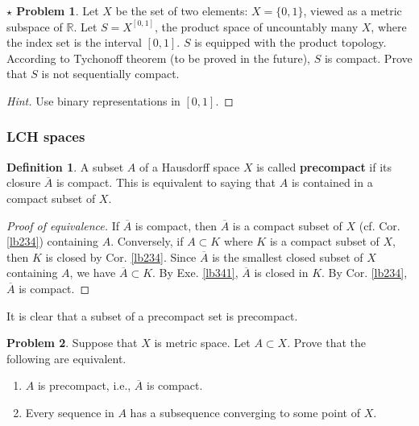 \documentclass[12pt,b5paper,notitlepage]{article}
\theoremstyle{definition}
\newtheorem{df}{Definition}[section]
\newtheorem{prob}{\color{red}Problem}[section]
\newtheorem{sprob}[prob]{\color{red}$\star$ Problem}
\theoremstyle{plain}
\newcommand{\ovl}{\overline}
\newcommand{\Rbb}{\mathbb R}
\numberwithin{equation}{section}
\begin{document}
\begin{sprob}
Let $X$ be the set of two elements: $X=\{0,1\}$, viewed as a metric subspace of $\Rbb$. Let $S=X^{[0,1]}$, the product space of uncountably many $X$, where the index set is the  interval $[0,1]$. $S$ is equipped with the product topology. According to Tychonoff theorem (to be proved in the future), $S$ is compact. Prove that $S$ is not sequentially compact.
\end{sprob}


\begin{proof}[Hint]
Use binary representations in $[0,1]$.
\end{proof}




\subsubsection{LCH spaces}


\begin{df}\label{lb458}
A subset $A$ of a Hausdorff space $X$ is called \textbf{precompact}  if its closure $\ovl A$ is compact. This is equivalent to saying that $A$ is contained in a compact subset of $X$.   
\end{df}

\begin{proof}[Proof of equivalence]
If $\ovl A$ is compact, then $\ovl A$ is a compact subset of $X$ (cf. Cor. \ref{lb234}) containing $A$. Conversely, if $A\subset K$ where $K$ is a compact subset of $X$, then $K$ is closed by Cor. \ref{lb234}. Since $\ovl A$ is the smallest closed subset of $X$ containing $A$, we have $\ovl A\subset K$. By Exe. \ref{lb341}, $\ovl A$ is closed in $K$. By Cor. \ref{lb234}, $\ovl A$ is compact.
\end{proof}



It is clear that a subset of a precompact set is precompact.

\begin{prob}\label{lb287}
Suppose that $X$ is metric space. Let $A\subset X$. Prove that the following are equivalent.
\begin{enumerate}[label=(\arabic*)]
\item $A$ is precompact, i.e., $\ovl A$ is compact.
\item Every sequence in $A$ has a subsequence converging to some point of $X$.
\end{enumerate}
\end{prob}
\end{document}
